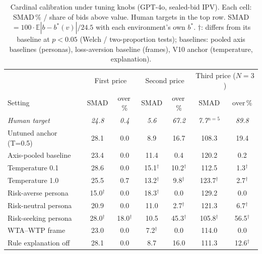 \begin{table}[t]
\centering
\caption{Cardinal calibration under tuning knobs (GPT-4o, sealed-bid IPV).
Each cell: SMAD\,\% / share of bids above value. Human targets in the top row.
SMAD $=100\cdot\mathbb{E}|b-b^*(v)|/24.5$ with each environment's own $b^*$.
$\dagger$: differs from its baseline at $p<0.05$ (Welch / two-proportion tests);
baselines: pooled axis baselines (personas), loss-aversion baseline (frames),
V10 anchor (temperature, explanation).}
\label{tab:cardinal-tuning}
\begin{tabular}{lcccccc}
\toprule
& \multicolumn{2}{c}{First price} & \multicolumn{2}{c}{Second price} & \multicolumn{2}{c}{Third price ($N{=}3$)} \\
Setting & SMAD & over\,\% & SMAD & over\,\% & SMAD & over\,\% \\
\midrule
\emph{Human target} & \emph{24.8} & \emph{0.4} & \emph{5.6} & \emph{67.2} & \emph{7.7}$^{n=5}$ & \emph{89.8} \\
\midrule
Untuned anchor (T=0.5)   & 28.1 & 0.0  & 8.9  & 16.7 & 108.3 & 19.4 \\
Axis-pooled baseline     & 23.4 & 0.0  & 11.4 & 0.4  & 120.2 & 0.2  \\
Temperature 0.1          & 28.6 & 0.0  & 15.1$^\dagger$ & 10.2$^\dagger$ & 112.5 & 1.3$^\dagger$ \\
Temperature 1.0          & 25.5 & 0.7  & 13.2$^\dagger$ & 9.8$^\dagger$  & 123.7$^\dagger$ & 2.7$^\dagger$ \\
Risk-averse persona      & 15.0$^\dagger$ & 0.0 & 18.3$^\dagger$ & 0.0 & 129.2 & 0.0 \\
Risk-neutral persona     & 20.9 & 0.0 & 11.0 & 2.7$^\dagger$ & 121.3 & 6.7$^\dagger$ \\
Risk-seeking persona     & 28.0$^\dagger$ & 18.0$^\dagger$ & 10.5 & 45.3$^\dagger$ & 105.8$^\dagger$ & 56.5$^\dagger$ \\
WTA--WTP frame           & 23.0 & 0.0  & 7.2$^\dagger$  & 0.0  & 114.0 & 0.0 \\
Rule explanation off     & 28.1 & 0.0  & 8.7  & 16.0 & 111.3 & 12.6$^\dagger$ \\
\bottomrule
\end{tabular}
\end{table}

